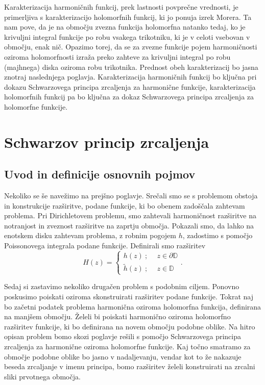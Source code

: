 \documentclass[mat1, tisk]{fmfdelo}
\begin{document}
    Karakterizacija harmoničnih funkcij, prek lastnosti povprečne vrednosti, je primerljiva s karakterizacijo holomorfnih funkcij, ki jo ponuja izrek Morera. 
    Ta nam pove, da je na območju zvezna funkcija holomorfna natanko tedaj, ko je krivuljni integral funkcije po robu vsakega trikotniku, ki je v celoti vsebovan v območju, enak nič.
    Opazimo torej, da se za zvezne funkcije pojem harmoničnosti oziroma holomorfnosti izraža preko zahteve za krivuljni integral po robu (majhnega) diska oziroma robu trikotnika.
    Prednost obeh karakterizacij bo jasna znotraj naslednjega poglavja. Karakterizacija harmoničnih funkcij bo ključna pri dokazu Schwarzovega principa zrcaljenja za harmonične funkcije, 
    karakterizacija holomorfnih funkcij pa bo ključna za dokaz Schwarzovega principa zrcaljenja za holomorfne funkcije. 


\section{Schwarzov princip zrcaljenja}
\subsection{Uvod in definicije osnovnih pojmov}
    Nekoliko se še navežimo na prejšno poglavje. 
    Srečali smo se s problemom obstoja in konstrukcije razširitve, podane funkcije, ki bo obenem zadoščala zahtevam problema.  
    Pri Dirichletovem problemu, smo zahtevali harmoničnost razširitve na notranjost in zveznost razširitve na zaprtju območja. 
    Pokazali smo, da lahko na enotskem disku zahtevam problema, z robnim pogojem $h$, zadostimo s pomočjo Poissonovega integrala podane funkcije. Definirali smo razširitev
    $$
        H(z) = 
        \begin{cases}
            h(z)~;~~&z \in \partial \mathbb{D} \\
            \widetilde{h}(z)~;~~&z \in \mathbb{D}
        \end{cases}.
    $$

    Sedaj si zastavimo nekoliko drugačen problem s podobnim ciljem. Ponovno poskusimo poiskati oziroma skonstruirati razširitev podane funkcije. 
    Tokrat naj bo začetni podatek problema harmonična oziroma holomorfna funkcija, definirana na manjšem območju. Želeli bi poiskati harmonično oziroma holomorfno razširitev funkcije, ki bo definirana na novem območju podobne oblike.
    Na hitro opisan problem bomo skozi poglavje rešili s pomočjo Schwarzovega principa zrcaljenja za harmonične oziroma holomorfne funkcije. 
    Kaj točno smatramo za območje podobne oblike bo jasno v nadaljevanju, vendar kot to že nakazuje beseda zrcaljanje v imenu principa, bomo razširitev želeli konstruirati na zrcalni sliki prvotnega območja. 
    
\end{document}
